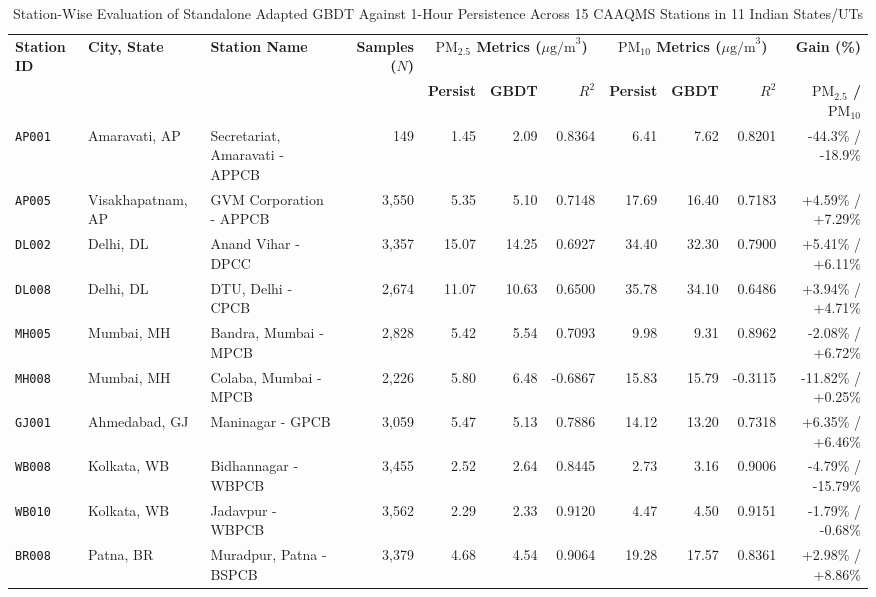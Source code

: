 \begin{table}[t]
\caption{Station-Wise Evaluation of Standalone Adapted GBDT Against 1-Hour Persistence Across 15 CAAQMS Stations in 11 Indian States/UTs}
\label{tab:multistation_performance}
\centering
\scriptsize
\begin{tabular}{lllrrrrrrrr}
\toprule
\textbf{Station ID} & \textbf{City, State} & \textbf{Station Name} & \textbf{Samples ($N$)} & \multicolumn{3}{c}{\textbf{$\text{PM}_{2.5}$ Metrics ($\mu\text{g/m}^3$)}} & \multicolumn{3}{c}{\textbf{$\text{PM}_{10}$ Metrics ($\mu\text{g/m}^3$)}} & \textbf{Gain (\%)} \\
\cmidrule(lr){5-7} \cmidrule(lr){8-10}
& & & & \textbf{Persist} & \textbf{GBDT} & \textbf{$R^2$} & \textbf{Persist} & \textbf{GBDT} & \textbf{$R^2$} & \textbf{$\text{PM}_{2.5}$ / $\text{PM}_{10}$} \\
\midrule
\texttt{AP001} & Amaravati, AP & Secretariat, Amaravati - APPCB & 149 & 1.45 & 2.09 & 0.8364 & 6.41 & 7.62 & 0.8201 & -44.3\% / -18.9\% \\
\texttt{AP005} & Visakhapatnam, AP & GVM Corporation - APPCB & 3,550 & 5.35 & 5.10 & 0.7148 & 17.69 & 16.40 & 0.7183 & +4.59\% / +7.29\% \\
\texttt{DL002} & Delhi, DL & Anand Vihar - DPCC & 3,357 & 15.07 & 14.25 & 0.6927 & 34.40 & 32.30 & 0.7900 & +5.41\% / +6.11\% \\
\texttt{DL008} & Delhi, DL & DTU, Delhi - CPCB & 2,674 & 11.07 & 10.63 & 0.6500 & 35.78 & 34.10 & 0.6486 & +3.94\% / +4.71\% \\
\texttt{MH005} & Mumbai, MH & Bandra, Mumbai - MPCB & 2,828 & 5.42 & 5.54 & 0.7093 & 9.98 & 9.31 & 0.8962 & -2.08\% / +6.72\% \\
\texttt{MH008} & Mumbai, MH & Colaba, Mumbai - MPCB & 2,226 & 5.80 & 6.48 & -0.6867 & 15.83 & 15.79 & -0.3115 & -11.82\% / +0.25\% \\
\texttt{GJ001} & Ahmedabad, GJ & Maninagar - GPCB & 3,059 & 5.47 & 5.13 & 0.7886 & 14.12 & 13.20 & 0.7318 & +6.35\% / +6.46\% \\
\texttt{WB008} & Kolkata, WB & Bidhannagar - WBPCB & 3,455 & 2.52 & 2.64 & 0.8445 & 2.73 & 3.16 & 0.9006 & -4.79\% / -15.79\% \\
\texttt{WB010} & Kolkata, WB & Jadavpur - WBPCB & 3,562 & 2.29 & 2.33 & 0.9120 & 4.47 & 4.50 & 0.9151 & -1.79\% / -0.68\% \\
\texttt{BR008} & Patna, BR & Muradpur, Patna - BSPCB & 3,379 & 4.68 & 4.54 & 0.9064 & 19.28 & 17.57 & 0.8361 & +2.98\% / +8.86\% \\

\end{tabular}
\end{table}
